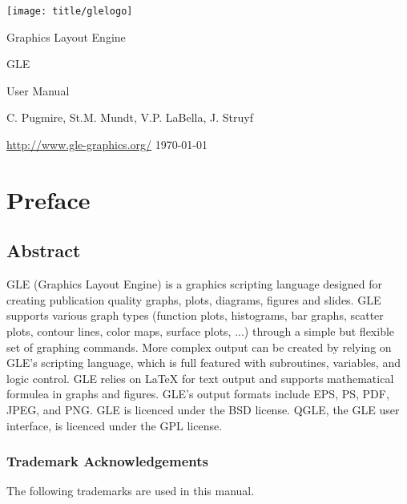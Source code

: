 \thispagestyle{empty}
\begin{center}
\texttt{[image: title/glelogo]}

{\Huge Graphics Layout Engine}

\vspace{1cm}

{\huge GLE \gleversion{}}

\vspace{1cm}

{\huge User Manual}

\vspace{1cm}

C. Pugmire, St.M. Mundt, V.P. LaBella, J. Struyf

\vspace{1cm}

\url{http://www.gle-graphics.org/}
\vfill
\today{}
\end{center}


\tableofcontents

\chapter{Preface}

\section*{Abstract}

GLE (Graphics Layout Engine) is a graphics scripting language designed for creating publication quality graphs, plots, diagrams, figures and slides. GLE supports various graph types (function plots, histograms, bar graphs, scatter plots, contour lines, color maps, surface plots, ...) through a simple but flexible set of graphing commands. More complex output can be created by relying on GLE's scripting language, which is full featured with subroutines, variables, and logic control. GLE relies on \LaTeX{} for text output and supports mathematical formulea in graphs and figures. GLE's output formats include EPS, PS, PDF, JPEG, and PNG. GLE is licenced under the BSD license. QGLE, the GLE user interface, is licenced under the GPL license.

\subsection*{Trademark Acknowledgements}
The following trademarks are used in this manual.

